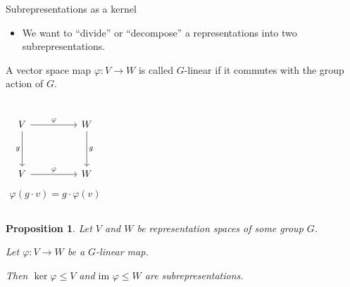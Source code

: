 \documentclass[10pt]{beamer}
\newtheorem{proposition}{Proposition}[theorem]
\begin{document}
	\begin{frame}{Subrepresentations as a kernel}
		
		\begin{itemize}
			\item We want to ``divide'' or ``decompose'' a representations into two subrepresentations.
		\end{itemize}\pause
		
		\begin{definition}
			A vector space map $\varphi : V \rightarrow W$ is called $G$-linear if it commutes with the group action of $G$.
			\begin{columns}
				\[\begin{tikzcd}[ampersand replacement=\&]
					V \&\& W \\
					\\
					V \&\& W
					\arrow["\varphi", from=1-1, to=1-3]
					\arrow["g"', from=1-1, to=3-1]
					\arrow["g", from=1-3, to=3-3]
					\arrow["\varphi", from=3-1, to=3-3]
				\end{tikzcd}\]
				\begin{align*}
					\varphi(g \cdot v) = g \cdot \varphi(v)
				\end{align*}
			\end{columns}
		\end{definition}\pause
		
		\begin{proposition}
			Let $V$ and $W$ be representation spaces of some group $G$.
			
			Let $\varphi: V \rightarrow W$ be a $G$-linear map. 
			
			Then $\ker \varphi \leq V$ and $\text{im } \varphi \leq W$ are subrepresentations.
		\end{proposition}
	\end{frame}
\end{document}
